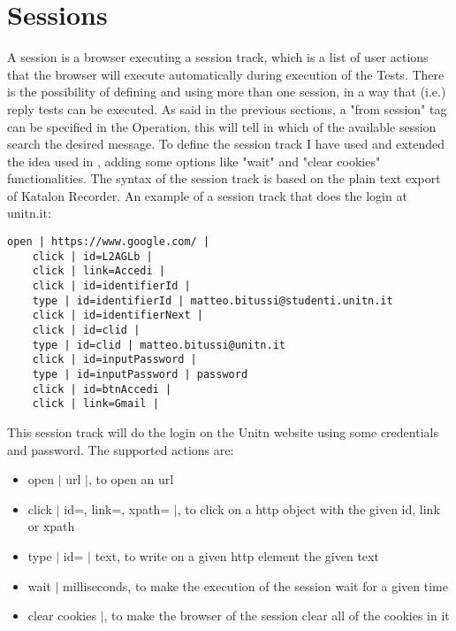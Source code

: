 \section{Sessions}
A session is a browser executing a \gls{session track}, which is a list of user actions that the browser will execute automatically during execution of the Tests. There is the possibility of defining and using more than one session, in a way that (i.e.) reply tests can be executed.
As said in the previous sections, a "from session" tag can be specified in the Operation, this will tell in which of the available session search the desired message. To define the \gls{session track} I have used and extended the idea used in \cite{giulio_pellizzari}\cite{claudio_grisenti}\cite{stefano_faccini}, adding some options like "wait" and "clear cookies" functionalities.
The syntax of the \gls{session track} is based on the plain text export of Katalon Recorder\cite{katalon_recorder_syntax}.
An example of a \gls{session track} that does the login at unitn.it:

\begin{lstlisting}[]
    open | https://www.google.com/ |
    click | id=L2AGLb |
    click | link=Accedi |
    click | id=identifierId |
    type | id=identifierId | matteo.bitussi@studenti.unitn.it
    click | id=identifierNext |
    click | id=clid |
    type | id=clid | matteo.bitussi@unitn.it
    click | id=inputPassword |
    type | id=inputPassword | password
    click | id=btnAccedi |
    click | link=Gmail |
\end{lstlisting}

This \gls{session track} will do the login on the Unitn website using some credentials and password. The supported actions are:
\begin{itemize}
    \item open $|$ url $|$, to open an url
    \item click $|$ id=, link=, xpath= $|$, to click on a http object with the given id, link or xpath
    \item type $|$ id= $|$ text, to write on a given http element the given text
    \item wait $|$ milliseconds, to make the execution of the session wait for a given time 
    \item clear cookies $|$, to make the browser of the session clear all of the cookies in it
\end{itemize}



